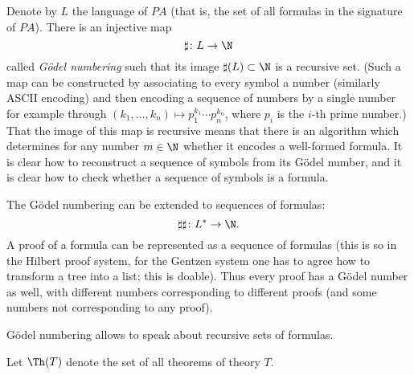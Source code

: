 

\setcounter{section}{3}
\setcounter{subsection}{5}
\setcounter{dfn}{31}

Denote by $L$ the language of $PA$ (that is, the set of all formulas in the signature of $PA$).
There is an injective map
\[
\sharp \colon L \to \N
\]
called \emph{G\"odel numbering} such that its image $\sharp(L) \subset \N$ is a recursive set.
(Such a map can be constructed by associating to every symbol a number (similarly ASCII encoding) and then encoding a sequence of numbers by a single number
for example through $(k_1, \ldots, k_n) \mapsto p_1^{k_1} \cdots p_n^{k_n}$, where $p_i$ is the $i$-th prime number.)
That the image of this map is recursive means that there is an algorithm which determines for any number $m \in \N$ whether it encodes a well-formed formula.
It is clear how to reconstruct a sequence of symbols from its G\"odel number, and it is clear how to check whether a sequence of symbols is a formula.

The G\"odel numbering can be extended to sequences of formulas:
\[
\sharp\sharp \colon L^* \to \N.
\]
A proof of a formula can be represented as a sequence of formulas
(this is so in the Hilbert proof system, for the Gentzen system one has to agree how to transform a tree into a list; this is doable).
Thus every proof has a G\"odel number as well, with different numbers corresponding to different proofs (and some numbers not corresponding to any proof).

G\"odel numbering allows to speak about recursive sets of formulas.

Let $\Th(T)$ denote the set of all theorems of theory $T$.



